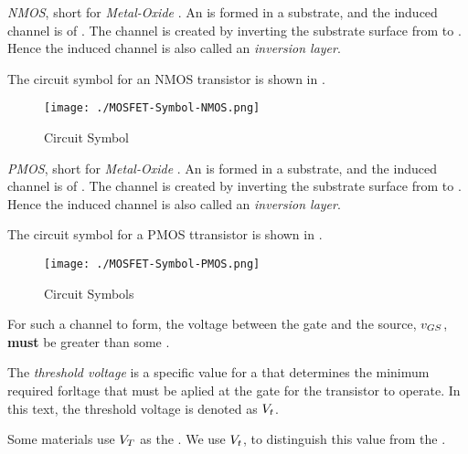 \begin{definition}[NMOS]\label{def:NMOS}
  \emph{NMOS}, short for \emph{ Metal-Oxide }.
  An   is formed in a \PType{} substrate, and the induced channel is of \PType{}.
  The channel is created by inverting the substrate surface from \PType{} to \NType{}.
  Hence the induced channel is also called an \emph{inversion layer}.

  The circuit symbol for an NMOS transistor is shown in .
\end{definition}

\begin{figure}[h!tbp]
  \centering
  \texttt{[image: ./MOSFET-Symbol-NMOS.png]}
  \caption{  Circuit Symbol \parencite[p.~265]{sedraTextbook7}}
  \label{fig:MOSFET-Symbol-NMOS}
\end{figure}

\begin{definition}[PMOS]\label{def:PMOS}
  \emph{PMOS}, short for \emph{ Metal-Oxide }.
  An   is formed in a \NType{} substrate, and the induced channel is of \PType{}.
  The channel is created by inverting the substrate surface from \NType{} to \PType{}.
  Hence the induced channel is also called an \emph{inversion layer}.

  The circuit symbol for a PMOS ttransistor is shown in .
\end{definition}

\begin{figure}[h!tbp]
  \centering
  \texttt{[image: ./MOSFET-Symbol-PMOS.png]}
  \caption{  Circuit Symbols \parencite[p.274]{sedraTextbook7}}
  \label{fig:MOSFET-Symbol-PMOS}
\end{figure}

For such a channel to form, the voltage between the gate and the source, $v_{GS}$, \textbf{must} be greater than some .

\begin{definition}\label{def:Threshold_Voltage}
  The \emph{threshold voltage} is a specific value for a  that determines the minimum required forltage that must be aplied at the gate for the transistor to operate.
  In this text, the threshold voltage is denoted as $V_{t}$.

  \begin{remark}[Notation]
    Some materials use $V_{T}$ as the .
    We use $V_{t}$, to distinguish this value from the .
  \end{remark}
\end{definition}

